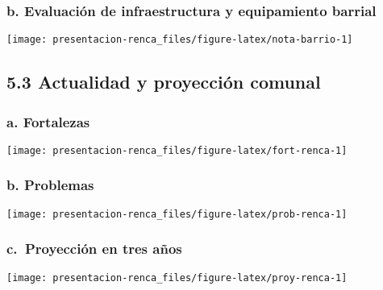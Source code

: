 \documentclass[
]{article}
\begin{document}
\hypertarget{b.-evaluaciuxf3n-de-infraestructura-y-equipamiento-barrial}{%
\subsubsection{b. Evaluación de infraestructura y equipamiento
barrial}\label{b.-evaluaciuxf3n-de-infraestructura-y-equipamiento-barrial}}

\begin{flushleft}\texttt{[image: presentacion-renca\_files/figure-latex/nota-barrio-1]} \end{flushleft}

\hypertarget{actualidad-y-proyecciuxf3n-comunal}{%
\subsection{5.3 Actualidad y proyección
comunal}\label{actualidad-y-proyecciuxf3n-comunal}}

\hypertarget{a.-fortalezas}{%
\subsubsection{a. Fortalezas}\label{a.-fortalezas}}

\begin{flushleft}\texttt{[image: presentacion-renca\_files/figure-latex/fort-renca-1]} \end{flushleft}

\hypertarget{b.-problemas}{%
\subsubsection{b. Problemas}\label{b.-problemas}}

\begin{flushleft}\texttt{[image: presentacion-renca\_files/figure-latex/prob-renca-1]} \end{flushleft}

\hypertarget{c.-proyecciuxf3n-en-tres-auxf1os}{%
\subsubsection{c.~Proyección en tres
años}\label{c.-proyecciuxf3n-en-tres-auxf1os}}

\begin{flushleft}\texttt{[image: presentacion-renca\_files/figure-latex/proy-renca-1]} \end{flushleft}
\end{document}
